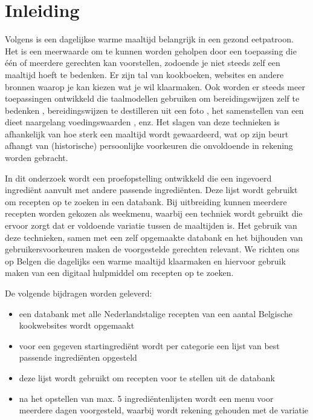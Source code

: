\documentclass{hogent-article}
\begin{document}


\section{Inleiding}%
\label{sec:inleiding}


Volgens \textcite{Galle2016} is een dagelijkse warme maaltijd belangrijk in een gezond eetpatroon. Het is een meerwaarde om te kunnen worden geholpen door een toepassing die één of meerdere gerechten kan voorstellen, zodoende je niet steeds zelf een maaltijd hoeft te bedenken. Er zijn tal van kookboeken, websites en andere bronnen waarop je kan kiezen wat je wil klaarmaken. Ook worden er steeds meer toepassingen ontwikkeld die taalmodellen gebruiken om bereidingswijzen zelf te bedenken \autocite{Santos2020}, bereidingswijzen te destilleren uit een foto \autocite{Salvador2019}, het samenstellen van een dieet naargelang voedingswaarden \autocite{Aljbawi2020}, enz. Het slagen van deze technieken is afhankelijk van hoe sterk een maaltijd wordt gewaardeerd, wat op zijn beurt afhangt van (historische) persoonlijke voorkeuren die onvoldoende in rekening worden gebracht.

In dit onderzoek wordt een proefopstelling ontwikkeld die een ingevoerd ingrediënt aanvult met andere passende ingrediënten. Deze lijst wordt gebruikt om recepten op te zoeken in een databank. Bij uitbreiding kunnen meerdere recepten worden gekozen als weekmenu, waarbij een techniek wordt gebruikt die ervoor zorgt dat er voldoende variatie tussen de maaltijden is. Het gebruik van deze technieken, samen met een zelf opgemaakte databank en het bijhouden van gebruikersvoorkeuren maken de voorgestelde gerechten relevant. We richten ons op Belgen die dagelijks een warme maaltijd klaarmaken en hiervoor gebruik maken van een digitaal hulpmiddel om recepten op te zoeken. 

De volgende bijdragen worden geleverd:
\begin{itemize}
    \item een databank met alle Nederlandstalige recepten van een aantal Belgische kookwebsites wordt opgemaakt
    \item voor een gegeven startingrediënt wordt per categorie een lijst van best passende ingrediënten opgesteld
    \item deze lijst wordt gebruikt om recepten voor te stellen uit de databank
    \item na het opstellen van max. 5 ingrediëntenlijsten wordt een menu voor meerdere dagen voorgesteld, waarbij wordt rekening gehouden met de variatie
\end{itemize}
\end{document}
